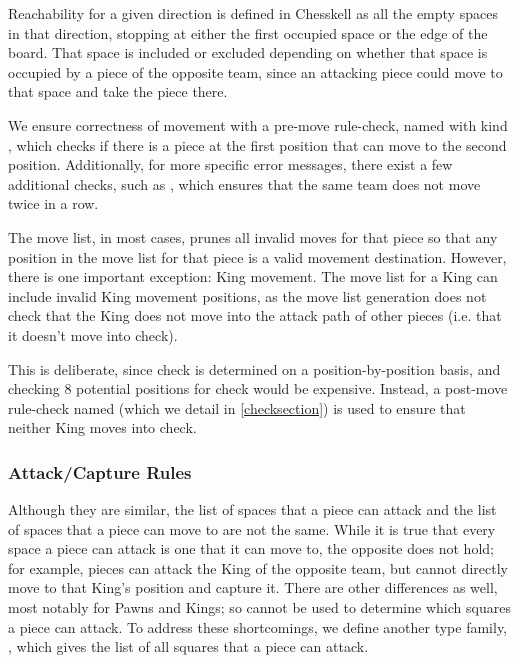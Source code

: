 Reachability for a given direction is defined in Chesskell as all the empty spaces in that direction, stopping at either the first occupied space or the edge of the board. That space is included or excluded depending on whether that space is occupied by a piece of the opposite team, since an attacking piece could move to that space and take the piece there.

We ensure correctness of movement with a pre-move rule-check, named  with kind , which checks if there is a piece at the first position that can move to the second position. Additionally, for more specific error messages, there exist a few additional checks, such as , which ensures that the same team does not move twice in a row.

The move list, in most cases, prunes all invalid moves for that piece so that any position in the move list for that piece is a valid movement destination. However, there is one important exception: King movement. The move list for a King can include invalid King movement positions, as the move list generation does not check that the King does not move into the attack path of other pieces (i.e. that it doesn't move into check).

This is deliberate, since check is determined on a position-by-position basis, and checking 8 potential positions for check would be expensive. Instead, a post-move rule-check named  (which we detail in \cref{checksection}) is used to ensure that neither King moves into check.

\subsubsection{Attack/Capture Rules}

Although they are similar, the list of spaces that a piece can attack and the list of spaces that a piece can move to are not the same. While it is true that every space a piece can attack is one that it can move to, the opposite does not hold; for example, pieces can attack the King of the opposite team, but cannot directly move to that King's position and capture it. There are other differences as well, most notably for Pawns and Kings; so  cannot be used to determine which squares a piece can attack. To address these shortcomings, we define another type family, , which gives the list of all squares that a piece can attack.

